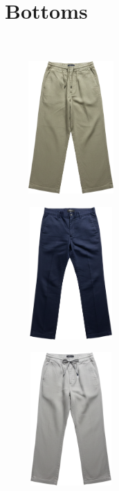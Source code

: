 \documentclass[10pt]{article}
\begin{document}
\section*{Bottoms}\
\vspace*{2mm}\noindent
\begin{minipage}[c][50.60mm][c]{50.60mm}\centering
\includegraphics[width=50.60mm,height=50.60mm,keepaspectratio]{assets/pants/green-linen-pants.png}\
\end{minipage} \hspace*{6.00mm} \begin{minipage}[c][50.60mm][c]{50.60mm}\centering
\includegraphics[width=50.60mm,height=50.60mm,keepaspectratio]{assets/pants/navy-linen-pants.png}\
\end{minipage} \hspace*{6.00mm} \begin{minipage}[c][50.60mm][c]{50.60mm}\centering
\includegraphics[width=50.60mm,height=50.60mm,keepaspectratio]{assets/pants/grey-linen-pants.png}\
\end{minipage} \hspace*{6.00mm} \begin{minipage}[c][50.60mm][c]{50.60mm}\centering

\end{minipage}
\end{document}
